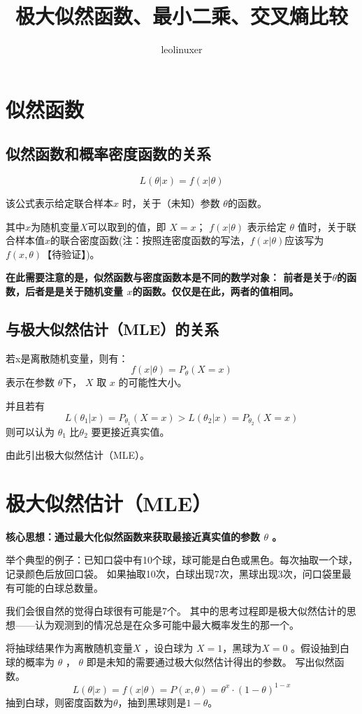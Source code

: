 \documentclass[12pt]{article}
\title{极大似然函数、最小二乘、交叉熵比较\cite{Comparison_Of_Maximum_Likelihood_Least_Square_Cross_Entropy}}
\author{leolinuxer}
\begin{document}
\maketitle
\tableofcontents

\section{似然函数}
\subsection{似然函数和概率密度函数的关系}
$$
L(\theta|x) = f(x|\theta)
$$

该公式表示给定联合样本$x$ 时，关于（未知）参数 $\theta$的函数。

其中$x$为随机变量$X$可以取到的值，即 $X=x$； $f(x|\theta)$ 表示给定 $\theta$ 值时，关于联合样本值$x$的联合密度函数(注：按照连密度函数的写法，$f(x|\theta)$应该写为$f(x,\theta)$【待验证】)。

\textbf{在此需要注意的是，似然函数与密度函数本是不同的数学对象： 前者是关于$\theta$的函数，后者是是关于随机变量 $x$的函数。仅仅是在此，两者的值相同。}

\subsection{与极大似然估计（MLE）的关系}
若x是离散随机变量，则有：
$$
f(x|\theta) = P_\theta(X = x)
$$
表示在参数 $\theta$下， $X$ 取 $x$ 的可能性大小。

并且若有
$$
L(\theta_1|x) = P_{\theta_1}(X=x) > L(\theta_2|x) = P_{\theta_2}(X=x)
$$
则可以认为 $\theta_1$ 比$\theta_2$ 要更接近真实值。

由此引出极大似然估计（MLE）。

\section{极大似然估计（MLE）}
\textbf{核心思想：通过最大化似然函数来获取最接近真实值的参数 $\theta$ 。}

举个典型的例子：已知口袋中有10个球，球可能是白色或黑色。每次抽取一个球，记录颜色后放回口袋。
如果抽取10次，白球出现7次，黑球出现3次，问口袋里最有可能的白球总数量。

我们会很自然的觉得白球很有可能是7个。
其中的思考过程即是极大似然估计的思想——认为观测到的情况总是在众多可能中最大概率发生的那一个。

将抽球结果作为离散随机变量$X$ ，设白球为 $X=1$，黑球为$X=0$ 。假设抽到白球的概率为 $\theta$ ， $\theta$ 即是未知的需要通过极大似然估计得出的参数。
写出似然函数。
$$
L(\theta|x) = f(x|\theta) = P(x,\theta) = \theta^x \cdot (1 - \theta)^{1-x}
$$
抽到白球，则密度函数为$\theta$，抽到黑球则是$1-\theta$。
\end{document}
